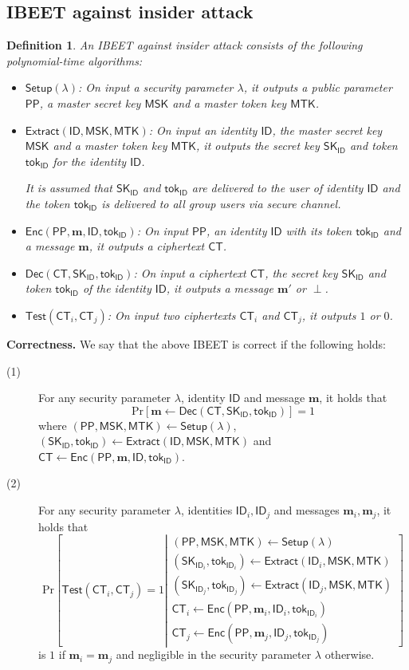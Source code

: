 \documentclass[runningheads]{llncs}
\newtheorem{defn}[thm]{Definition}
\def\bf{\mathbf}
\def\SK{\mathsf{SK}}
\def\PP{\mathsf{PP}}
\def\MSK{\mathsf{MSK}}
\def\MTK{\mathsf{MTK}}
\def\tok{\mathsf{tok}}
\def\CT{\mathsf{CT}}
\def\Setup{\mathsf{Setup}}
\def\Enc{\mathsf{Enc}}
\def\Extract{\mathsf{Extract}}
\def\Dec{\mathsf{Dec}}
\def\Test{\mathsf{Test}}
\def\Pr{\mathrm{Pr}}
\def\ID{\mathsf{ID}}
\begin{document}
\subsection{IBEET against insider attack}
\begin{defn} An IBEET against insider attack consists of the following polynomial-time algorithms:
	\begin{itemize}
		\item $\Setup(\lambda)$: On input a security parameter $\lambda$, it outputs a public parameter $\PP$, a master secret key $\MSK$ and a master token key $\MTK$.
		\item $\Extract(\ID,\MSK,\MTK)$: On input an identity $\ID$, the master secret key $\MSK$ and a master token key $\MTK$, it outputs the secret key $\SK_\ID$ and token $\tok_\ID$ for the identity $\ID$.
		
		It is assumed that $\SK_\ID$ and $\tok_\ID$ are delivered to the user of identity $\ID$ and the token $\tok_\ID$ is delivered to all group users via secure channel.
		\item $\Enc(\PP,\bf{m},\ID,\tok_\ID)$: On input $\PP$, an identity $\ID$ with its token $\tok_\ID$ and a message $\bf{m}$, it outputs a ciphertext $\CT$.
		\item $\Dec(\CT,\SK_{\ID},\tok_\ID)$: On input a ciphertext $\CT$, the secret key $\SK_\ID$ and token $\tok_\ID$ of the identity $\ID$, it outputs a message $\bf{m}'$ or $\perp$.
		\item $\Test(\CT_i,\CT_j)$: On input two ciphertexts $\CT_i$ and $\CT_j$, it outputs $1$ or $0$.
	\end{itemize}
\end{defn}

\noindent\textbf{Correctness.} We say that the above IBEET is correct if the following holds:
\begin{description}
	\item[(1)] For any security parameter $\lambda$, identity $\ID$ and message $\bf{m}$, it holds that
	$$\Pr[\bf{m}\gets\Dec(\CT,\SK_{\ID},\tok_\ID)]=1$$
	where $(\PP,\MSK,\MTK)\gets\Setup(\lambda)$, $(\SK_\ID,\tok_\ID)\gets\Extract(\ID,\MSK,\MTK)$ and $\CT\gets\Enc(\PP,\bf{m},\ID,\tok_\ID)$.
	\item[(2)] For any security parameter $\lambda$, identities $\ID_i, \ID_j$ and messages $\bf{m}_i,\bf{m}_j$, it holds that 
	$$\Pr\left[{
		\Test\left( \CT_i,\CT_j \right) = 1\left| \begin{array}{l}
		(\PP,\MSK,\MTK)\gets\Setup(\lambda) \\
		(\SK_{\ID_i},\tok_{\ID_i})\gets\Extract(\ID_i,\MSK,\MTK) \\
		(\SK_{\ID_j},\tok_{\ID_j})\gets\Extract(\ID_j,\MSK,\MTK) \\
		\CT_i\gets\Enc(\PP,\bf{m}_i,\ID_i,\tok_{\ID_i}) \\
		\CT_j\gets\Enc(\PP,\bf{m}_j,\ID_j,\tok_{\ID_j})
		\end{array}  \right.} \right]$$
	is $1$ if $\bf{m}_i=\bf{m}_j$ and negligible in the security parameter $\lambda$ otherwise.
\end{description}
\end{document}
